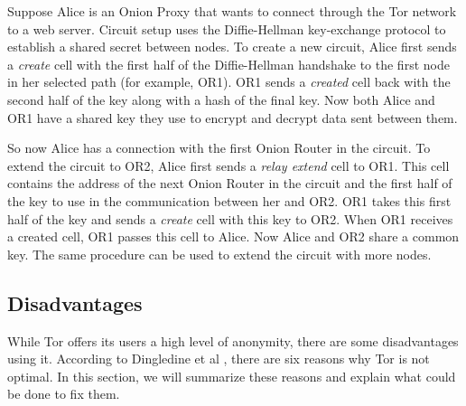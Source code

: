 \documentclass{article}
\begin{document}
		
		
		Suppose Alice is an Onion Proxy that wants to connect through the Tor network to a web server. Circuit setup uses the Diffie-Hellman key-exchange protocol \cite{diffiehellman} to establish a shared secret between nodes. To create a new circuit, Alice first sends a \emph{create} cell with the first half of the Diffie-Hellman handshake to the first node in her selected path (for example, OR1). OR1 sends a \emph{created} cell back with the second half of the key along with a hash of the final key. Now both Alice and OR1 have a shared key they use to encrypt and decrypt data sent between them.
		
		So now Alice has a connection with the first Onion Router in the circuit. To extend the circuit to OR2, Alice first sends a \emph{relay extend} cell to OR1. This cell contains the address of the next Onion Router in the circuit and the first half of the key to use in the communication between her and OR2. OR1 takes this first half of the key and sends a \emph{create} cell with this key to OR2. When OR1 receives a created cell, OR1 passes this cell to Alice. Now Alice and OR2 share a common key. The same procedure can be used to extend the circuit with more nodes.
			
	\subsection{Disadvantages}
		\label{ss:tor_disadvantages}

		While Tor offers its users a high level of anonymity, there are some disadvantages using it. According to Dingledine et al \cite{dingledine2009performance}, there are six reasons why Tor is not optimal. In this section, we will summarize these reasons and explain what could be done to fix them.
		
\end{document}
